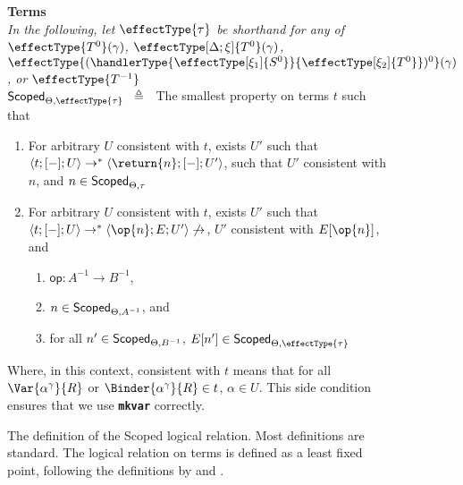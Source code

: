 \begin{figure}
\begin{rec-desc}
\textbf{Terms}\\
{\scriptsize{\textit{In the following, let $\effectType{\tau}$ be shorthand for any of $\effectType{T^{0}} (\gamma)$, $\effectType[\Delta; \xi]{T^{0}} (\gamma)$, $\effectType{(\handlerType{\effectType[\xi_1]{S^0}}{\effectType[\xi_2]{T^0}})^{0}} (\gamma)$, or $\effectType{T^{-1}}$}}}\\

$\scoped{\effectType{\tau}} \hspace{2mm} \triangleq \hspace{2mm}$ The smallest property on terms $t$ such that 
\begin{enumerate}
  \item For arbitrary $U$ consistent with $t$, exists $U'$ such that $\langle t;[-];U \rangle \to^{*} \langle \return{n}; [-]; U' \rangle$, such that $U'$ consistent with $n$, and $n \in \textsf{Scoped}_{{\Theta}, {\tau}}$ 
  \item For arbitrary $U$ consistent with $t$, exists $U'$ such that $\langle t;[-];U \rangle \to^{*} \langle \op{n}; E; U' \rangle \not\to$, $U'$ consistent with $E[\op{n}]$, and 
  \begin{enumerate}
    \item $\textsf{op}: A^{-1} \to B^{-1}$,
    \item $n \in \textsf{Scoped}_{{\Theta}, {A^{-1}}}$, and 
    \item for all $n' \in \textsf{Scoped}_{{\Theta}, {B^{-1}}}$, $E[n'] \in \scoped{\effectType{\tau}}$
  \end{enumerate}
\end{enumerate}
Where, in this context, consistent with $t$ means that for all $\Var{\alpha^\gamma}{R}$ or $\Binder{\alpha^\gamma}{R} \in t$, $\alpha \in U$. This side condition ensures that we use \textbf{\texttt{mkvar}} correctly.
\end{rec-desc}
\caption{The definition of the \textsf{Scoped} logical relation. Most definitions are standard. The logical relation on terms is defined as a least fixed point, following the definitions by \citet{plotkin-2025} and \citet{kuchta-2023}.}
\label{fig:logical-relation-defn}
\end{figure}

